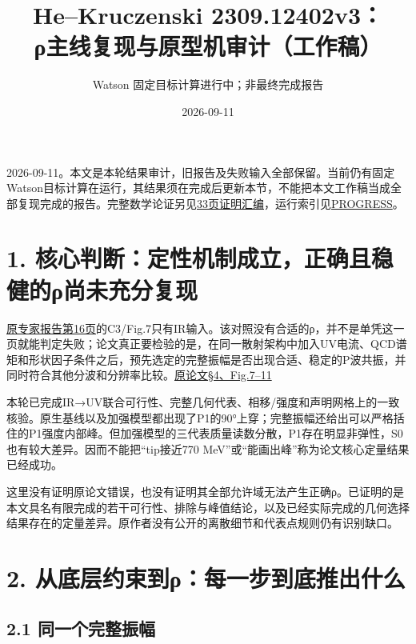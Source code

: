 \documentclass[
  10pt,
  a4paper,
]{article}
\title{He--Kruczenski 2309.12402v3：\\
ρ主线复现与原型机审计（工作稿）}
\subtitle{Watson 固定目标计算进行中；非最终完成报告}
\author{}
\date{2026-09-11}
\begin{document}
\maketitle

{
\setcounter{tocdepth}{2}
\tableofcontents
}
2026-09-11。本文是本轮结果审计，旧报告及失败输入全部保留。当前仍有固定Watson目标计算在运行，其结果须在完成后更新本节，不能把本文工作稿当成全部复现完成的报告。完整数学论证另见\href{../proof_bundle_v2/PROOFS_ZH.pdf}{33页证明汇编}，运行索引见\href{../PROGRESS.json}{PROGRESS}。

\section{1.
核心判断：定性机制成立，正确且稳健的ρ尚未充分复现}\label{ux6838ux5fc3ux5224ux65adux5b9aux6027ux673aux5236ux6210ux7acbux6b63ux786eux4e14ux7a33ux5065ux7684ux3c1ux5c1aux672aux5145ux5206ux590dux73b0}

\href{../../../reports/expert_review_20260910/He_Kruczenski_2309v3_Expert_Review_ZH.pdf}{原专家报告第16页}的C3/Fig.7只有IR输入。该对照没有合适的ρ，并不是单凭这一页就能判定失败；论文真正要检验的是，在同一散射架构中加入UV电流、QCD谱矩和形状因子条件之后，预先选定的完整振幅是否出现合适、稳定的P波共振，并同时符合其他分波和分辨率比较。\href{https://arxiv.org/abs/2309.12402v3}{原论文§4、Fig.7--11}

本轮已完成IR→UV联合可行性、完整几何代表、相移/强度和声明网格上的一致核验。原生基线以及加强模型都出现了P1的90°上穿；完整振幅还给出可以严格括住的P1强度内部峰。但加强模型的三代表质量读数分散，P1存在明显非弹性，S0也有较大差异。因而不能把``tip接近770
MeV''或``能画出峰''称为论文核心定量结果已经成功。

这里没有证明原论文错误，也没有证明其全部允许域无法产生正确ρ。已证明的是本文具名有限完成的若干可行性、排除与峰值结论，以及已经实际完成的几何选择结果存在的定量差异。原作者没有公开的离散细节和代表点规则仍有识别缺口。

\section{2.
从底层约束到ρ：每一步到底推出什么}\label{ux4eceux5e95ux5c42ux7ea6ux675fux5230ux3c1ux6bcfux4e00ux6b65ux5230ux5e95ux63a8ux51faux4ec0ux4e48}

\subsection{2.1
同一个完整振幅}\label{ux540cux4e00ux4e2aux5b8cux6574ux632fux5e45}
\end{document}
